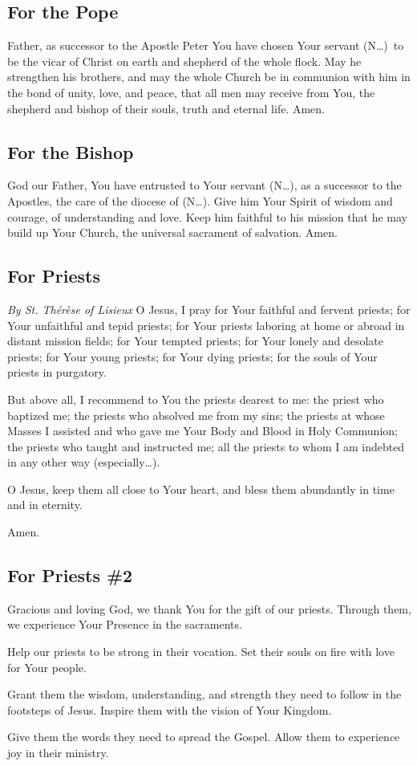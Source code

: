 \documentclass[12pt]{article}
\newcommand{\prayertitle}[1]{\subsection{#1}}
\newcommand{\insertname}{(N\dots)\xspace}
\newcommand{\emphasis}[1]{\emph{#1}}
\newcommand{\emphasis}[1]{\textsl{#1}}
\newcommand{\note}[1]{{\small{\emphasis{#1}}}\newline}
\begin{document}
\prayertitle{For the Pope}
Father, as successor to the Apostle Peter You have chosen Your servant \insertname\ to be the vicar of Christ on earth and shepherd of the whole flock.
May he strengthen his brothers, and may the whole Church be in communion with him in the bond of unity, love, and peace, that all men may receive from You, the shepherd and bishop of their souls, truth and eternal life.
Amen.
\newpage
\prayertitle{For the Bishop}
God our Father, You have entrusted to Your servant \insertname, as a successor to the Apostles, the care of the diocese of \insertname.
Give him Your Spirit of wisdom and courage, of understanding and love.
Keep him faithful to his mission that he may build up Your Church, the universal sacrament of salvation.
Amen.

\prayertitle{For Priests}
\note{By St. Th\'{e}r\`{e}se of Lisieux}
O Jesus, I pray for Your faithful and fervent priests;
for Your unfaithful and tepid priests;
for Your priests laboring at home or abroad in distant mission fields;
for Your tempted priests;
for Your lonely and desolate priests;
for Your young priests;
for Your dying priests;
for the souls of Your priests in purgatory.

But above all, I recommend to You the priests dearest to me:
the priest who baptized me;
the priests who absolved me from my sins;
the priests at whose Masses I assisted and who gave me Your Body and Blood in Holy Communion;
the priests who taught and instructed me;
all the priests to whom I am indebted in any other way (especially\ldots).

O Jesus, keep them all close to Your heart,
and bless them abundantly in time and in eternity.

Amen.

\prayertitle{For Priests \#2}
Gracious and loving God, we thank You for the gift of our priests.
Through them, we experience Your Presence in the sacraments.

Help our priests to be strong in their vocation.
Set their souls on fire with love for Your people.

Grant them the wisdom, understanding, and strength they need to follow in the footsteps of Jesus.
Inspire them with the vision of Your Kingdom.

Give them the words they need to spread the Gospel.
Allow them to experience joy in their ministry.
\end{document}
